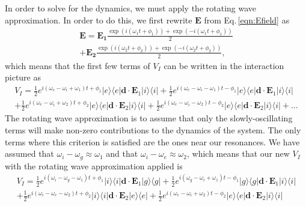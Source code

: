 In order to solve for the dynamics, we must apply the rotating wave approximation. 
In order to do this, we first rewrite $\mathbf{E}$ from Eq.\,\ref{eqn:Efield} as 
\begin{multline}
\label{Ebreakdown}
\mathbf{E}=\mathbf{E_1}\frac{\exp(i (\omega_1 t + \phi_1))+\exp(-i(\omega_1 t +\phi_1))}{2}\\
+\mathbf{E_2}\frac{\exp(i (\omega_2 t + \phi_2))+\exp(-i(\omega_2 t +\phi_2))}{2},
\end{multline}
which means that the first few terms of $V_I$ can be written in the interaction picture as
\begin{multline}
\label{Vbreakdown}
V_I=\frac{1}{2}e^{i(\omega_e-\omega_i+\omega_1)t+\phi_1}|e\rangle\langle e|\mathbf{d}\cdot\mathbf{E}_1| i\rangle\langle i | + \frac{1}{2}e^{i(\omega_e-\omega_i-\omega_1)t-\phi_1}|e\rangle\langle e|\mathbf{d}\cdot\mathbf{E}_1| i\rangle\langle i| \\
+
\frac{1}{2}e^{i(\omega_e-\omega_i+\omega_2)t+\phi_2}|e\rangle\langle e|\mathbf{d}\cdot\mathbf{E}_2| i\rangle\langle i| + \frac{1}{2}e^{i(\omega_e-\omega_i-\omega_2)t-\phi_2}|e\rangle\langle e|\mathbf{d}\cdot\mathbf{E}_2| i\rangle\langle i| +
\ldots
\end{multline}
The rotating wave approximation is to assume that only the slowly-oscillating terms will make non-zero contributions to the dynamics of the system\cite{Young1997363}. The only terms where this criterion is satisfied are the ones near our resonances. 
We have assumed that $\omega_i-\omega_g\approx\omega_1$ and that $\omega_i-\omega_e\approx\omega_2$, which means that our new $V_I$ with the rotating wave approximation applied is
\begin{multline}
V_I=\frac{1}{2}e^{i(\omega_i-\omega_g-\omega_1)t+\phi_1}|i\rangle\langle i|\mathbf{d}\cdot\mathbf{E}_1| g\rangle\langle g | + \frac{1}{2}e^{i(\omega_g-\omega_i+\omega_1)t-\phi_1}|g\rangle\langle g|\mathbf{d}\cdot\mathbf{E}_1| i\rangle\langle i| \\
+
\frac{1}{2}e^{i(\omega_i-\omega_e-\omega_2)t+\phi_2}|i\rangle\langle i|\mathbf{d}\cdot\mathbf{E}_2| e\rangle\langle e| + \frac{1}{2}e^{i(\omega_e-\omega_i+\omega_2)t-\phi_2}|e\rangle\langle e|\mathbf{d}\cdot\mathbf{E}_2| i\rangle\langle i| 
\end{multline}

